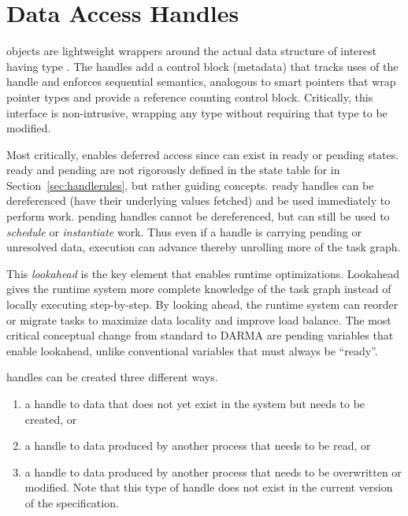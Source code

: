 

\section{Data Access Handles}
\label{sec:handles}
 objects are lightweight wrappers around the actual
data structure of interest having type . 
The \glspl{handle} add a control block (metadata) that tracks uses of the \gls{handle} and enforces
\gls{sequential semantics}, analogous to smart pointers that wrap pointer types and provide a reference counting control block.
Critically, this interface is non-intrusive, wrapping any type  without requiring that type to be modified.

Most critically, \ahandle enables deferred access since \ahandle can exist in
\gls{ready} or \gls{pending} states. 
\Gls{ready} and \gls{pending} are not rigorously defined in the state table for \ahandle in
Section~\ref{sec:handlerules}, but rather guiding concepts.
\Gls{ready} \glspl{handle} can be dereferenced (have their underlying values
\gls{fetch}ed) and be used immediately to perform work.
\Gls{pending} \glspl{handle} cannot be dereferenced, but can still be used to \emph{schedule} or \emph{instantiate} work.
Thus even if a \gls{handle} is carrying \gls{pending} or unresolved data, execution can advance thereby unrolling more of the task graph.

This \emph{lookahead} is the key element that enables runtime optimizations.
Lookahead gives the \gls{runtime system} more complete knowledge of the task graph instead of locally executing step-by-step.
By looking ahead, the \gls{runtime system} can reorder or migrate \glspl{task} to maximize data locality and improve load balance.
The most critical conceptual change from standard \CC{} to \gls{DARMA} are
\gls{pending} variables that enable lookahead, unlike conventional \CC{}
variables that must always be ``\gls{ready}''.

\Glspl{handle} can be created three different ways.
\begin{enumerate}
  \item a \gls{handle} to data that does not yet exist in the system
but needs to be created, or
\item a \gls{handle} to data produced by another process that needs to
be read, or 
\item a \gls{handle} to data produced by another process that needs to be overwritten or modified. 
  Note that this type of \gls{handle} does not exist in the current version of
  the specification.
\end{enumerate}


